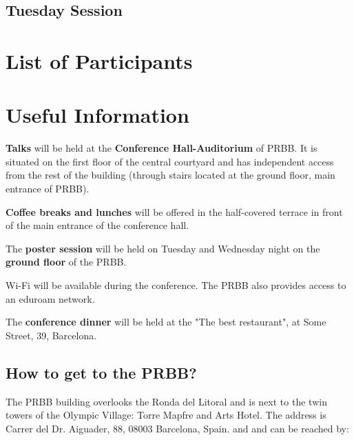 \documentclass[openany, parskip=full, 12pt, a4]{scrbook}
\begin{document}
\vspace{-2.5em}

\section{Tuesday Session}












\chapter{List of Participants}
 

 

\chapter{Useful Information}

\textbf{Talks} will be held at the \textbf{Conference Hall-Auditorium} of PRBB. It is situated on the first floor of the central courtyard and
has independent access from the rest of the building (through stairs located at the ground floor, main entrance of PRBB). 

\textbf{Coffee breaks and lunches} will be offered in the half-covered terrace in front of the main entrance of the conference hall.

The \textbf{poster session} will be held on Tuesday and Wednesday night on the \textbf{ground floor} of the PRBB. 

Wi-Fi will be available during the conference. The PRBB also provides access to an eduroam network.

The \textbf{conference dinner} will be held at the "The best restaurant", at Some Street, 39, Barcelona.

\section{How to get to the PRBB?}

The PRBB building overlooks the Ronda del Litoral and is next to the twin towers of the Olympic Village: Torre Mapfre and Arts Hotel. The address is Carrer del Dr. Aiguader, 88, 08003 Barcelona, Spain. and and can be reached by:
\end{document}
